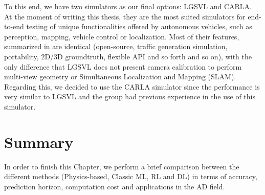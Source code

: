 To this end, we have two simulators as our final options: LGSVL and \ac{CARLA}. At the moment of writing this thesis, they are the most suited simulators for end-to-end testing of unique functionalities offered by autonomous vehicles, such as perception, mapping, vehicle control or localization. Most of their features, summarized in \cite{kaur2021survey} are identical (open-source, traffic generation simulation, portability, 2D/3D groundtruth, flexible API and so forth and so on), with the only difference that LGSVL does not present camera calibration to perform multi-view geometry or Simultaneous Localization and Mapping (SLAM). Regarding this, we decided to use the \ac{CARLA} simulator since the performance is very similar to LGSVL and the group had previous experience in the use of this simulator. %

\section{Summary}
\label{sec:2_summary}

In order to finish this Chapter, we perform a brief comparison between the different methods (Physics-based, Classic \ac{ML}, \ac{RL} and \ac{DL}) in terms of accuracy, prediction horizon, computation cost and applications in the \ac{AD} field. 

